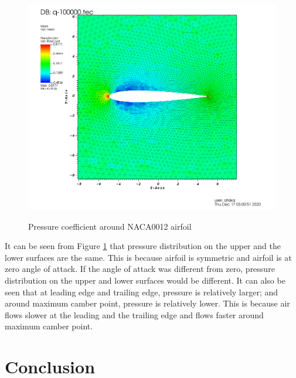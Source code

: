 \documentclass[letterpaper,12pt]{article}
\begin{document}
\begin{figure} [!h]
	\centering
	\includegraphics[height = 10cm]{graph/medium/medium_pressure0000.png}
	\caption{Pressure coefficient around NACA0012 airfoil}
    \label{fig:airfoilpressure}
\end{figure}

It can be seen from Figure \ref{fig:airfoilpressure} that pressure distribution on the upper and the lower surfaces are the same.
This is because airfoil is symmetric and airfoil is at zero angle of attack. If the angle of attack was different from zero, 
pressure distribution on the upper and lower surfaces would be different. It can also be seen that at leading edge and trailing edge,
pressure is relatively larger; and around maximum camber point, pressure is relatively lower. This is because air flows slower at the 
leading and the trailing edge and flows faster around maximum camber point.

\section{Conclusion}
\end{document}
